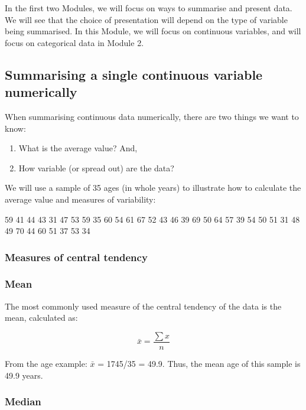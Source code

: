 \documentclass[
  a4paper,
]{memoir}
\providecommand{\tightlist}{%
  \setlength{\itemsep}{0pt}\setlength{\parskip}{0pt}}\usepackage{longtable,booktabs,array}
\begin{document}
In the first two Modules, we will focus on ways to summarise and present
data. We will see that the choice of presentation will depend on the
type of variable being summarised. In this Module, we will focus on
continuous variables, and will focus on categorical data in Module 2.

\hypertarget{summarising-a-single-continuous-variable-numerically}{%
\subsection{Summarising a single continuous variable
numerically}\label{summarising-a-single-continuous-variable-numerically}}

When summarising continuous data numerically, there are two things we
want to know:

\begin{enumerate}
\def\labelenumi{\arabic{enumi}.}
\tightlist
\item
  What is the average value? And,
\item
  How variable (or spread out) are the data?
\end{enumerate}

We will use a sample of 35 ages (in whole years) to illustrate how to
calculate the average value and measures of variability:

59 41 44 43 31 47 53 59 35 60 54 61 67 52 43 46 39 69 50 64 57 39 54 50
51 31 48 49 70 44 60 51 37 53 34

\hypertarget{sec-measures-of-central-tendency}{%
\subsubsection{Measures of central
tendency}\label{sec-measures-of-central-tendency}}

\hypertarget{mean}{%
\subsubsection{Mean}\label{mean}}

The most commonly used measure of the central tendency of the data is
the mean, calculated as:

\[\bar{x} = \frac{\sum x}{n}\]

From the age example: \(\bar{x}\) = 1745/35 = 49.9. Thus, the mean age
of this sample is 49.9 years.

\hypertarget{median}{%
\subsubsection{Median}\label{median}}
\end{document}
